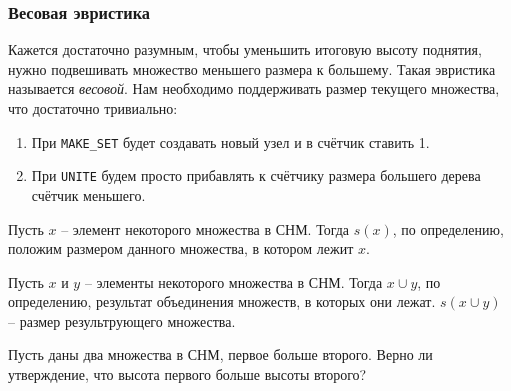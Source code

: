 \subsubsection{Весовая эвристика}

Кажется достаточно разумным, чтобы уменьшить итоговую высоту поднятия, нужно подвешивать множество меньшего размера к большему.
Такая эвристика называется \textit{весовой}. Нам необходимо поддерживать размер текущего множества, что достаточно тривиально:
\begin{enumerate}
    \item При \texttt{MAKE\_SET} будет создавать новый узел и в счётчик ставить 1.
    \item При \texttt{UNITE} будем просто прибавлять к счётчику размера большего дерева счётчик меньшего.
\end{enumerate}

\Def Пусть $x$ -- элемент некоторого множества в СНМ. Тогда $s(x)$, по определению, положим размером данного множества, в котором лежит $x$.

\Def Пусть $x$ и $y$ -- элементы некоторого множества в СНМ. Тогда $x \cup y$, по определению, результат объединения множеств, в которых они лежат. $s(x \cup y)$ -- размер результрующего множества.

\Exe Пусть даны два множества в СНМ, первое больше второго. Верно ли утверждение, что высота первого больше высоты второго?

